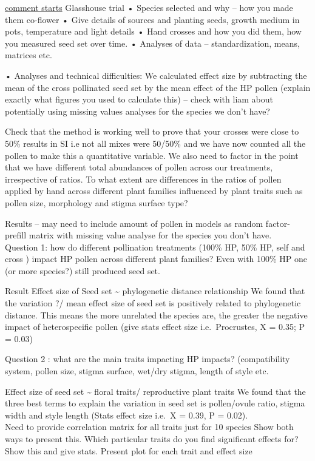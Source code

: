 \documentclass[11pt,a4paper]{article}
\begin{document}
\href{}{comment starts} Glasshouse trial • Species selected and why --
how you made them co-flower • Give details of sources and planting
seeds, growth medium in pots, temperature and light details • Hand
crosses and how you did them, how you measured seed set over time. •
Analyses of data -- standardization, means, matrices etc.

• Analyses and technical difficulties: We calculated effect size by
subtracting the mean of the cross pollinated seed set by the mean effect
of the HP pollen (explain exactly what figures you used to calculate
this) -- check with liam about potentially using missing values analyses
for the species we don't have?

Check that the method is working well to prove that your crosses were
close to 50\% results in SI i.e not all mixes were 50/50\% and we have
now counted all the pollen to make this a quantitative variable. We also
need to factor in the point that we have different total abundances of
pollen across our treatments, irrespective of ratios. To what extent are
differences in the ratios of pollen applied by hand across different
plant families influenced by plant traits such as pollen size,
morphology and stigma surface type?

Results -- may need to include amount of pollen in models as random
factor- prefill matrix with missing value analyse for the species you
don't have.\\
Question 1: how do different pollination treatments (100\% HP, 50\% HP,
self and cross ) impact HP pollen across different plant families? Even
with 100\% HP one (or more species?) still produced seed set.

Result Effect size of Seed set \textasciitilde{} phylogenetic distance
relationship We found that the variation ?/ mean effect size of seed set
is positively related to phylogenetic distance. This means the more
unrelated the species are, the greater the negative impact of
heterospecific pollen (give stats effect size i.e.~Procrustes, X = 0.35;
P = 0.03)

Question 2 : what are the main traits impacting HP impacts?
(compatibility system, pollen size, stigma surface, wet/dry stigma,
length of style etc.

Effect size of seed set \textasciitilde{} floral traits/ reproductive
plant traits We found that the three best terms to explain the variation
in seed set is pollen/ovule ratio, stigma width and style length (Stats
effect size i.e.~X = 0.39, P = 0.02).\\
Need to provide correlation matrix for all traits just for 10 species
Show both ways to present this. Which particular traits do you find
significant effects for? Show this and give stats. Present plot for each
trait and effect size
\end{document}
